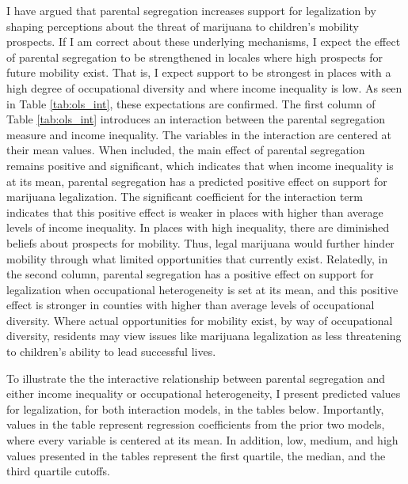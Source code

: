 I have argued that parental segregation increases support for legalization by shaping perceptions about the threat of marijuana to children's mobility prospects. If I am correct about these underlying mechanisms, I expect the effect of parental segregation to be strengthened in locales where high prospects for future mobility exist. That is, I expect support to be strongest in places with a high degree of occupational diversity and where income inequality is low. As seen in Table \ref{tab:ols_int}, these expectations are confirmed. The first column of Table \ref{tab:ols_int} introduces an interaction between the parental segregation measure and income inequality. The variables in the interaction are centered at their mean values. When included, the main effect of parental segregation remains positive and significant, which indicates that when income inequality is at its mean, parental segregation has a predicted positive effect on support for marijuana legalization. The significant coefficient for the interaction term indicates that this positive effect is weaker in places with higher than average levels of income inequality. In places with high inequality, there are diminished beliefs about prospects for mobility. Thus, legal marijuana would further hinder mobility through what limited opportunities that currently exist. Relatedly, in the second column, parental segregation has a positive effect on support for legalization when occupational heterogeneity is set at its mean, and this positive effect is stronger in counties with higher than average levels of occupational diversity. Where actual opportunities for mobility exist, by way of occupational diversity, residents may view issues like marijuana legalization as less threatening to children's ability to lead successful lives.

%



To illustrate the the interactive relationship between parental segregation and either income inequality or occupational heterogeneity, I present predicted values for legalization, for both interaction models, in the tables below. Importantly, values in the table represent regression coefficients from the prior two models, where every variable is centered at its mean. In addition, low, medium, and high values presented in the tables represent the first quartile, the median, and the third quartile cutoffs. 


